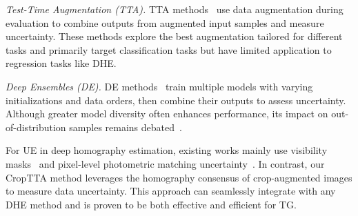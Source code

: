 \textit{Test-Time Augmentation (TTA).} TTA methods~\cite{shanmugam2021better, kimura2021understanding, kim2020learning, zhang2022memo} use data augmentation during evaluation to combine outputs from augmented input samples and measure uncertainty. These methods explore the best augmentation tailored for different tasks and primarily target classification tasks but have limited application to regression tasks like DHE.

\textit{Deep Ensembles (DE).} DE methods~\cite{lakshminarayanan2017simple, NEURIPS2021_a70dc404,fort2019deep,abe2022deep} train multiple models with varying initializations and data orders, then combine their outputs to assess uncertainty. Although greater model diversity often enhances performance, its impact on out-of-distribution samples remains debated~\cite{fort2019deep, abe2022deep}.

For UE in deep homography estimation, existing works mainly use visibility masks~\cite{zhang2022hvc} and pixel-level photometric matching uncertainty~\cite{xu2022cuahn}. In contrast, our CropTTA method leverages the homography consensus of crop-augmented images to measure data uncertainty. This approach can seamlessly integrate with any DHE method and is proven to be both effective and efficient for TG.
\vspace{-5pt}



